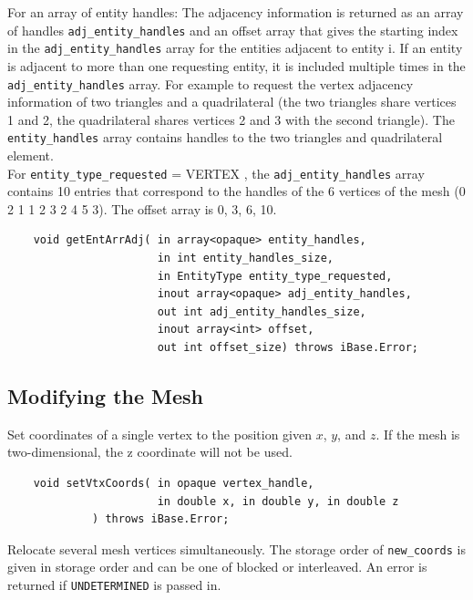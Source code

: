 \documentclass{article}
\begin{document}
For an array of entity handles: The adjacency information is 
returned as an array of handles {\tt adj\_entity\_handles} and an offset 
array that gives the starting index in the {\tt adj\_entity\_handles} 
array for the entities adjacent to entity i. If an entity is 
adjacent to more than one requesting entity, it is included multiple 
times in the {\tt adj\_entity\_handles} array. For example to request 
the vertex adjacency information of two triangles and a quadrilateral 
(the two triangles share vertices 1 and 2, the quadrilateral 
shares vertices 2 and 3 with the second triangle). The {\tt entity\_handles} 
array contains handles to the two triangles and quadrilateral 
element. \\

For {\tt entity\_type\_requested} = VERTEX , the {\tt adj\_entity\_handles} array contains 10 entries that correspond 
to the handles of the 6 vertices of the mesh (0 2 1 1 2 3 2 4 
5 3). The offset array is 0, 3, 6, 10.

\begin{verbatim}
    void getEntArrAdj( in array<opaque> entity_handles, 
                       in int entity_handles_size, 
                       in EntityType entity_type_requested,  
                       inout array<opaque> adj_entity_handles,  
                       out int adj_entity_handles_size, 
                       inout array<int> offset, 
                       out int offset_size) throws iBase.Error;
\end{verbatim}


\subsection{Modifying the Mesh}
Set coordinates of a single vertex to the position given $x$, $y$, 
and $z$. If the mesh is two-dimensional, the z coordinate will 
not be used.

\begin{verbatim}
    void setVtxCoords( in opaque vertex_handle,   
                       in double x, in double y, in double z
		     ) throws iBase.Error;
\end{verbatim}

Relocate several mesh vertices simultaneously. The storage order 
of {\tt new\_coords} is given in storage order and can be one of blocked 
or interleaved. An error is returned if {\tt UNDETERMINED} is passed 
in.
\end{document}
